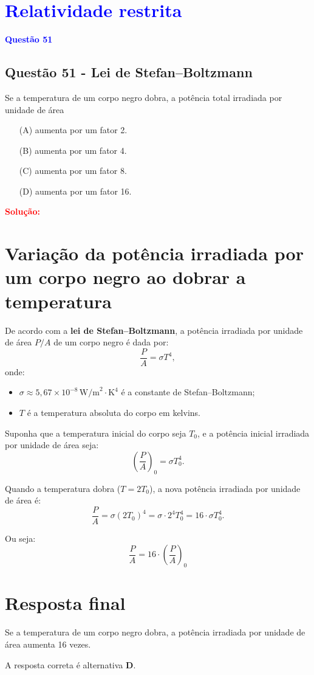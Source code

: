 \section{\large \textcolor{blue}{Relatividade restrita}}

\begin{flushleft}
\textbf{\textcolor{blue}{\Large Quest\~ao 51}}\\
\noindent
\subsection{Quest\~ao 51 - Lei de Stefan--Boltzmann}
Se a temperatura de um corpo negro dobra, a potência total
irradiada por unidade de área

\begin{itemize}
\item[(A)] aumenta por um fator 2.
\item[(B)] aumenta por um fator 4.
\item[(C)] aumenta por um fator 8.
\item[(D)] aumenta por um fator 16.
\end{itemize}

\vspace{0.5cm}

\textcolor{red}{\textbf{Solução:}}\\
\section*{Variação da potência irradiada por um corpo negro ao dobrar a temperatura}

De acordo com a \textbf{lei de Stefan--Boltzmann}, a potência irradiada por unidade de área \( P/A \) de um corpo negro é dada por:
\[
\frac{P}{A} = \sigma T^4,
\]
onde:
\begin{itemize}
    \item \( \sigma \approx 5,67 \times 10^{-8} \, \text{W/m}^2\cdot\text{K}^4 \) é a constante de Stefan--Boltzmann;
    \item \( T \) é a temperatura absoluta do corpo em kelvins.
\end{itemize}

Suponha que a temperatura inicial do corpo seja \( T_0 \), e a potência inicial irradiada por unidade de área seja:
\[
\left( \frac{P}{A} \right)_0 = \sigma T_0^4.
\]

Quando a temperatura dobra (\( T = 2T_0 \)), a nova potência irradiada por unidade de área é:
\[
\frac{P}{A} = \sigma (2T_0)^4 = \sigma \cdot 2^4 T_0^4 = 16 \cdot \sigma T_0^4.
\]

Ou seja:
\[
\frac{P}{A} = 16 \cdot \left( \frac{P}{A} \right)_0
\]

\section*{Resposta final}

Se a temperatura de um corpo negro dobra, a potência irradiada por unidade de área aumenta 16 vezes.

A resposta correta é alternativa \colorbox{green!50}{\textbf{D}}.
\end{flushleft}

